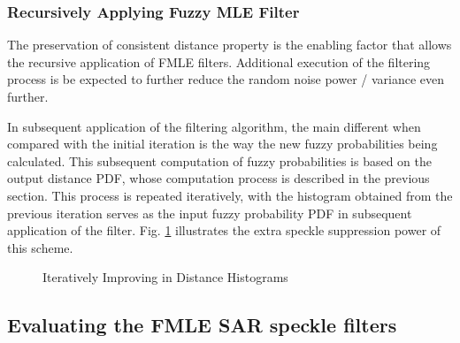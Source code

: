 \subsubsection{Recursively Applying Fuzzy MLE Filter}

The preservation of consistent distance property is the enabling factor that allows the recursive application of FMLE filters.
Additional execution of the filtering process is be expected to further reduce the random noise power / variance even further.

In subsequent application of the filtering algorithm, the main different when compared with the initial iteration is the way the new fuzzy probabilities being calculated.
This subsequent computation of fuzzy probabilities is based on the output distance PDF, whose computation process is described in the previous section.
This process is repeated iteratively, with the histogram obtained from the previous iteration serves as the input fuzzy probability PDF in subsequent application of the filter.
Fig. \ref{fig:plot_incl_distance_pdf_by_iterations} illustrates the extra speckle suppression power of this scheme.

\begin{figure}[H]
\centering
\caption{Iteratively Improving in Distance Histograms}
\label{fig:plot_incl_distance_pdf_by_iterations}
\end{figure}

\subsection{Evaluating the FMLE SAR speckle filters}

